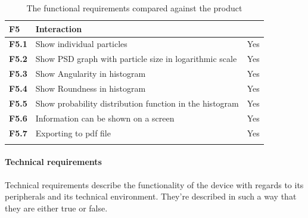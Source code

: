 \documentclass[11pt,fleqn,,a4paper,twoside,openright]{book}
\begin{document}
\begin{longtable}{|p{1cm}| p{9cm} p{2.5cm}|}
	\hline 
	\textbf{F5}\label{F5} & \textbf{Interaction} &  \\ 
	\hline 
	\textbf{F5.1}\label{F5.1} & Show individual particles  & Yes \\ 
	\hline 
	\textbf{F5.2}\label{F5.2} & Show PSD graph with particle size in logarithmic scale  & Yes  \\ 
	\hline 
	\textbf{F5.3}\label{F5.3} & Show Angularity in histogram  & Yes \\ 
	\hline 
	\textbf{F5.4}\label{F5.4} & Show Roundness in histogram & Yes \\ 
	\hline 
	\textbf{F5.5}\label{F5.5} & Show probability distribution function in the histogram & Yes \\ 
	\hline 
	\textbf{F5.6}\label{F5.6} & Information can be shown on a screen & Yes \\
	\hline 
	\textbf{F5.7}\label{F5.7} & Exporting to pdf file & Yes \\
	\hline 
	\caption{The functional requirements compared against the product}\label{tab:FuncReqCompaire}
\end{longtable} 

\newpage
\paragraph{Technical requirements}
Technical requirements describe the functionality of the device with regards to its peripherals and its technical environment. They're described in such a way that they are either true or false.
\end{document}
